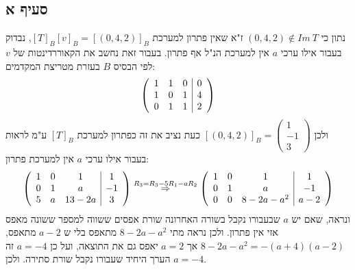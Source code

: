 \documentclass{article}
\begin{document}
	\subsection*{סעיף א}
	נתון כי $(0,4,2) \not \in Im \ T$ ז"א שאין פתרון למערכת $[T]_B[v]_B = [(0,4,2)]_B$, נבדוק בעבור אילו ערכי $a$ אין למערכת הנ"ל אף פתרון.
	בעבור זאת נחשב את הקאוררדינטות של $v$ לפי הבסיס $B$ בעזרת מטריצת המקדמים:
	\begin{align*}
		\left( \begin{array}{ccc|c}
			1 & 1 & 0 & 0 \\
			1 & 0 & 1 & 4 \\
			0 & 1 & 1 & 2
		\end{array} \right)
	\end{align*}
	ולכן $[(0,4,2)]_B = \begin{pmatrix}
		1 \\
		-1 \\
		3
	\end{pmatrix}$
	כעת נציב את זה כפתרון למערכת $[T]_B$ ע"מ לראות בעבור אילו ערכי $a$ אין למערכת פתרון:
	\begin{align*}
		\left( \begin{array}{ccc|c}
			1 & 0 & 1 & 1 \\
			0 & 1 & a & -1 \\
			5 & a & 13-2a & 3
		\end{array} \right) \overset{R_3 = R_3 - 5R_1 -aR_2}\Rightarrow
		\left( \begin{array}{ccc|c}
			1 & 0 & 1 & 1 \\
			0 & 1 & a & -1 \\
			0 & 0 & 8-2a-a^2 & a-2
		\end{array} \right)
	\end{align*}
	ונראה, שאם יש $a$ שבעבורו נקבל בשורה האחרונה שורת אפסים ששווה למספר ששונה מאפס אזי אין פתרון.
	ולכן נראה מתי $8-2a-a^2$ מתאפס בלי ש $a-2$ מתאפס, $8-2a-a^2=-(a+4)(a-2)$ אך $a=2$ יאפס גם את התוצאה, ועל כן $a=-4$ זה הערך היחיד שעבורו נקבל שורת סתירה.
	ולכן $a=-4$.
\end{document}
